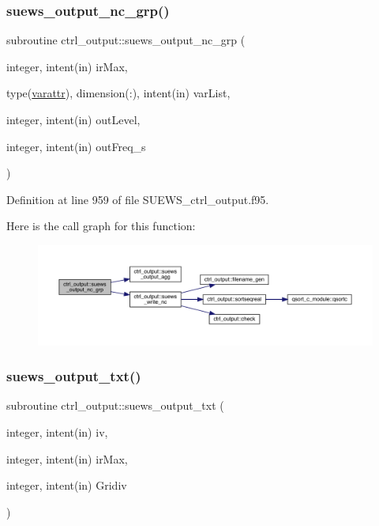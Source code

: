 \subsubsection{\texorpdfstring{suews\+\_\+output\+\_\+nc\+\_\+grp()}{suews\_output\_nc\_grp()}}
{\footnotesize\ttfamily subroutine ctrl\+\_\+output\+::suews\+\_\+output\+\_\+nc\+\_\+grp (\begin{DoxyParamCaption}\item[{integer, intent(in)}]{ir\+Max,  }\item[{type(\hyperlink{structctrl__output_1_1varattr}{varattr}), dimension(\+:), intent(in)}]{var\+List,  }\item[{integer, intent(in)}]{out\+Level,  }\item[{integer, intent(in)}]{out\+Freq\+\_\+s }\end{DoxyParamCaption})}



Definition at line 959 of file S\+U\+E\+W\+S\+\_\+ctrl\+\_\+output.\+f95.

Here is the call graph for this function\+:\nopagebreak
\begin{figure}[H]
\begin{center}
\leavevmode
\includegraphics[width=350pt]{namespacectrl__output_a333bec5a308bd89762292b7f695bdb9b_cgraph}
\end{center}
\end{figure}
\mbox{\label{namespacectrl__output_a33e3b788edad27be3211458c4388f8e5}} 
\subsubsection{\texorpdfstring{suews\+\_\+output\+\_\+txt()}{suews\_output\_txt()}}
{\footnotesize\ttfamily subroutine ctrl\+\_\+output\+::suews\+\_\+output\+\_\+txt (\begin{DoxyParamCaption}\item[{integer, intent(in)}]{iv,  }\item[{integer, intent(in)}]{ir\+Max,  }\item[{integer, intent(in)}]{Gridiv }\end{DoxyParamCaption})}



